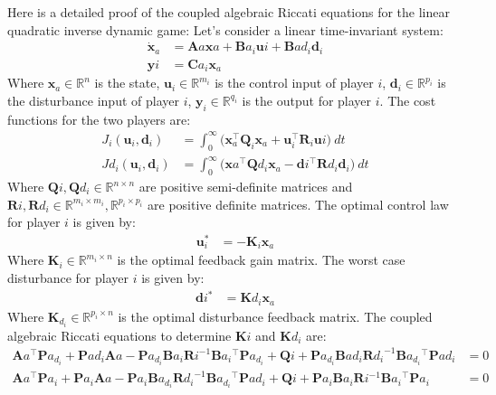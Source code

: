 \documentclass[3p]{elsarticle}
\begin{document}
Here is a detailed proof of the coupled algebraic Riccati equations for the linear quadratic inverse dynamic game:
Let's consider a linear time-invariant system:
\begin{align}
\dot{\mathbf{x}}_a &= \mathbf{A}a\mathbf{x}a + \mathbf{B}{a_i}\mathbf{u}i + \mathbf{B}{a{d_i}}\mathbf{d}_i \\
\mathbf{y}i &= \mathbf{C}{a_i}\mathbf{x}_a
\end{align}
Where $\mathbf{x}_a \in \mathbb{R}^n$ is the state, $\mathbf{u}_i \in \mathbb{R}^{m_i}$ is the control input of player $i$, $\mathbf{d}_i \in \mathbb{R}^{p_i}$ is the disturbance input of player $i$, $\mathbf{y}_i \in \mathbb{R}^{q_i}$ is the output for player $i$.
The cost functions for the two players are:
\begin{align}
J_i(\mathbf{u}_i, \mathbf{d}_i) &= \int_0^{\infty} \big(\mathbf{x}_a^\top \mathbf{Q}_i \mathbf{x}_a + \mathbf{u}_i^\top \mathbf{R}_i \mathbf{u}i\big) \: dt \\
J{d_i}(\mathbf{u}_i, \mathbf{d}_i) &= \int_0^{\infty} \big(\mathbf{x}a^\top \mathbf{Q}{d_i} \mathbf{x}_a - \mathbf{d}i^\top \mathbf{R}{d_i} \mathbf{d}_i\big) \: dt
\end{align}
Where $\mathbf{Q}i, \mathbf{Q}{d_i} \in \mathbb{R}^{n\times n}$ are positive semi-definite matrices and $\mathbf{R}i, \mathbf{R}{d_i} \in \mathbb{R}^{m_i\times m_i}, \mathbb{R}^{p_i\times p_i}$ are positive definite matrices.
The optimal control law for player $i$ is given by:
\begin{align}
\mathbf{u}_i^* &= -\mathbf{K}_i \mathbf{x}_a
\end{align}
Where $\mathbf{K}_i \in \mathbb{R}^{m_i\times n}$ is the optimal feedback gain matrix.
The worst case disturbance for player $i$ is given by:
\begin{align}
\mathbf{d}i^* &= \mathbf{K}{d_i}\mathbf{x}_a
\end{align}
Where $\mathbf{K}_{d_i} \in \mathbb{R}^{p_i\times n}$ is the optimal disturbance feedback matrix.
The coupled algebraic Riccati equations to determine $\mathbf{K}i$ and $\mathbf{K}{d_i}$ are:
\begin{align}
\mathbf{A}a^\top \mathbf{P}{a_{d_i}} + \mathbf{P}{a{d_i}} \mathbf{A}a - \mathbf{P}{a_{d_i}}\mathbf{B}{a_i}\mathbf{R}i^{-1}\mathbf{B}{a_i}^\top\mathbf{P}{a_{d_i}} + \mathbf{Q}i + \mathbf{P}{a_{d_i}}\mathbf{B}{a{d_i}}\mathbf{R}{d_i}^{-1}\mathbf{B}{a_{d_i}}^\top\mathbf{P}{a{d_i}} &= 0 \\
\mathbf{A}a^\top \mathbf{P}{a_i} + \mathbf{P}{a_i} \mathbf{A}a - \mathbf{P}{a_i}\mathbf{B}{a_{d_i}}\mathbf{R}{d_i}^{-1}\mathbf{B}{a_{d_i}}^\top\mathbf{P}{a{d_i}} + \mathbf{Q}i + \mathbf{P}{a_i}\mathbf{B}{a_i}\mathbf{R}i^{-1}\mathbf{B}{a_i}^\top\mathbf{P}{a_i} &= 0
\end{align}
\end{document}
